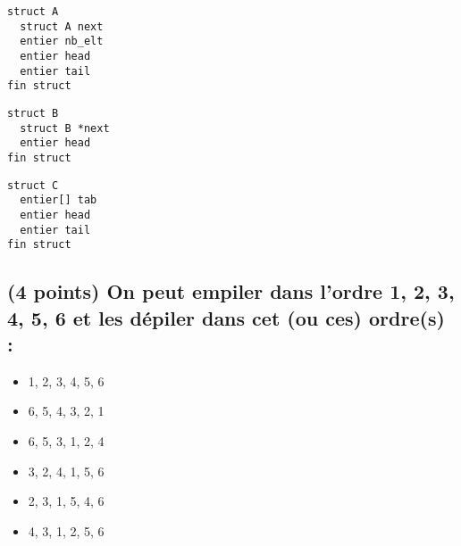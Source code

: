 \documentclass[11pt,a4paper]{article}
\begin{document}
\begin{table}[ht!]
  \centering
  \begin{minipage}{0.28\textwidth}
    \centering
\begin{lstlisting}[style=algorithmique]
struct A
  struct A next
  entier nb_elt
  entier head
  entier tail
fin struct \end{lstlisting}
  \CaseCoche
  \end{minipage}
  \hfillx
  \begin{minipage}{0.28\textwidth}
    \centering
\begin{lstlisting}[style=algorithmique]
struct B
  struct B *next
  entier head
fin struct \end{lstlisting}
  \checkmark
  \end{minipage}
  \hfillx
  \begin{minipage}{0.28\textwidth}
    \centering
\begin{lstlisting}[style=algorithmique]
struct C
  entier[] tab
  entier head
  entier tail
fin struct \end{lstlisting}
  \checkmark
  \end{minipage}
\end{table}


\bigskip
\vspace*{1cm}


\subsection{(4 points) On peut empiler dans l'ordre 1, 2, 3, 4, 5, 6 et les dépiler dans cet (ou ces) ordre(s) : }


\begin{table}[ht!]
  \centering
  \begin{minipage}{0.45\textwidth}
    \centering
\begin{itemize}
  \item[\checkmark] 1, 2, 3, 4, 5, 6
  \item[\checkmark] 6, 5, 4, 3, 2, 1
  \item[\CaseCoche] 6, 5, 3, 1, 2, 4
\end{itemize}
  \end{minipage}
  \hfillx
  \begin{minipage}{0.45\textwidth}
    \centering
\begin{itemize}
  \item[\checkmark] 3, 2, 4, 1, 5, 6
  \item[\checkmark] 2, 3, 1, 5, 4, 6
  \item[\CaseCoche] 4, 3, 1, 2, 5, 6
\end{itemize}
  \end{minipage}
\end{table}
\end{document}
